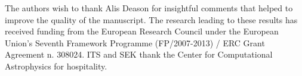 \documentclass[fleqn,usenatbib]{mnras}
\begin{document}
The authors wish to thank Alis Deason for insightful comments that
helped to improve the quality of the manuscript.  The research leading
to these results has received funding from the European Research
Council under the European Union's Seventh Framework Programme
(FP/2007-2013) / ERC Grant Agreement n. 308024. ITS and SEK thank the
Center for Computational Astrophysics for hospitality.





\bsp	%
\label{lastpage}
\end{document}
